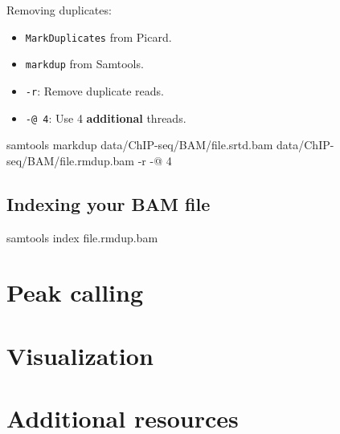\documentclass[]{article}
\newenvironment{Shaded}{\begin{snugshade}}{\end{snugshade}}
\newcommand{\ExtensionTok}[1]{#1}
\newcommand{\NormalTok}[1]{#1}
\begin{document}
Removing duplicates:

\begin{itemize}
\item
  \texttt{MarkDuplicates} from Picard.
\item
  \texttt{markdup} from Samtools.
\item
  \texttt{-r}: Remove duplicate reads.
\item
  \texttt{-@\ 4}: Use 4 \textbf{additional} threads.
\end{itemize}

\begin{Shaded}
\begin{Highlighting}[]
\ExtensionTok{samtools}\NormalTok{ markdup data/ChIP-seq/BAM/file.srtd.bam data/ChIP-seq/BAM/file.rmdup.bam -r -@ 4}
\end{Highlighting}
\end{Shaded}

\subsection{Indexing your BAM file}\label{indexing-your-bam-file}

\begin{Shaded}
\begin{Highlighting}[]
\ExtensionTok{samtools}\NormalTok{ index file.rmdup.bam}
\end{Highlighting}
\end{Shaded}

\section{Peak calling}\label{peak-calling}

\section{Visualization}\label{visualization}

\section{Additional resources}\label{additional-resources}
\end{document}
